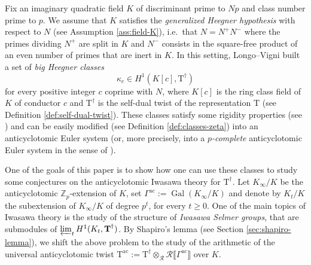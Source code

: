 \documentclass[12pt,reqno]{amsart}
\theoremstyle{definition}
\theoremstyle{remark}
\newcommand{\numberset}{\mathbb}
\newcommand{\Z}{\numberset{Z}}
\newcommand{\T}{\boldsymbol{\mathrm{T}}}
\newcommand{\calR}{\mathcal{R}}
\DeclareMathOperator{\Gal}{Gal}
\newcommand{\ac}{\mathrm{ac}}
\newcommand{\gk}{\kappa}
\begin{document}
Fix an imaginary quadratic field $K$ of discriminant prime to $Np$ and class number prime to $p$. We assume that $K$ satisfies the \emph{generalized Heegner hypothesis} with respect to $N$ (see Assumption \ref{ass:field-K}), i.e.~that $N=N^+ N^-$ where the primes dividing $N^+$ are split in $K$ and $N^-$ consists in the square-free product of an even number of primes that are inert in $K$. In this setting, Longo--Vigni \cite{Longo-Vigni11:quaternion-algebras-Hida-families} built a set of \emph{big Heegner classes}
\begin{equation*}
    \gk_c\in H^1(K[c],\T^\dag)
\end{equation*}
for every positive integer $c$ coprime with $N$, where $K[c]$ is the ring class field of $K$ of conductor $c$ and $\T^\dag$ is the self-dual twist of the representation $\T$ (see Definition \ref{def:self-dual-twist}). These classes satisfy some rigidity properties (see \cite[§8]{Longo-Vigni11:quaternion-algebras-Hida-families}) and can be easily modified (see Definition \ref{def:classes-zeta}) into an anticyclotomic Euler system (or, more precisely, into a \emph{$p$-complete} anticyclotomic Euler system in the sense of \cite{mastella-zerman2025:anticyclotomic}).

One of the goals of this paper is to show how one can use these classes to study some conjectures on the anticyclotomic Iwasawa theory for $\T^\dag$. Let $K_\infty/K$ be the anticyclotomic $\Z_p$-extension of $K$, set $\Gamma^\ac:=\Gal(K_\infty/K)$ and denote by $K_t/K$ the subextension of $K_\infty/K$ of degree $p^t$, for every $t\ge 0$. One of the main topics of Iwasawa theory is the study of the structure of \emph{Iwasawa Selmer groups}, that are submodules of $\varprojlim_t H^1(K_t,\T^\dag)$. By Shapiro's lemma (see Section \ref{sec:shapiro-lemma}), we shift the above problem to the study of the arithmetic of the universal anticyclotomic twist $\T^\ac:=\T^\dag\otimes_\calR\calR\llbracket\Gamma^\ac\rrbracket$ over $K$.
\end{document}
